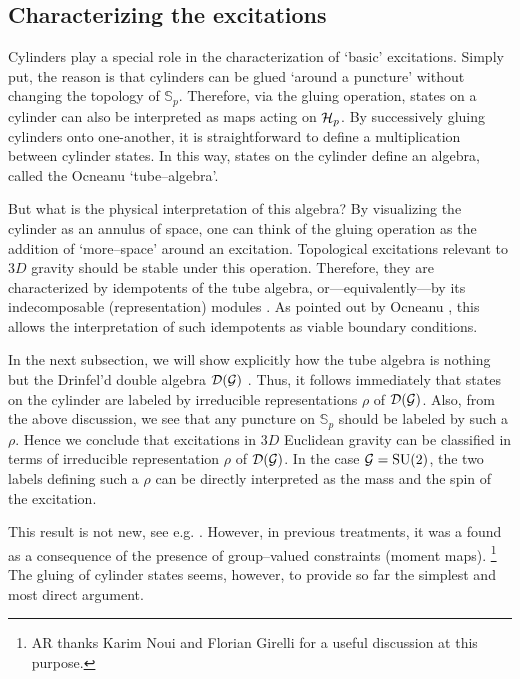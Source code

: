 \documentclass[nofootinbib,superscriptaddress,eqsecnum,tightenlines,11pt]{revtex4-1}
\def\SU{\text{SU}}
\renewcommand{\S}{{\mathbb S}}
\begin{document}
\subsection{Characterizing the excitations}

Cylinders play a special role in the characterization of `basic' excitations. 
Simply put, the reason is that cylinders can be glued `around a puncture' without changing the topology of $\S_p$.
Therefore, via the gluing operation, states on a cylinder can also be interpreted as maps acting on ${\cal H}_p$.
By successively gluing cylinders onto one-another, it is straightforward to define a multiplication between cylinder states.
In this way, states on the cylinder define an algebra, called the Ocneanu `tube--algebra'. 

But what is the physical interpretation of this algebra?
By visualizing the cylinder as an annulus of space, one can think of the gluing operation as the addition of `more--space' around an excitation.
Topological excitations relevant to $3D$ gravity should be stable under this operation.
Therefore, they are characterized by idempotents of the tube algebra, or---equivalently---by its indecomposable (representation) modules \cite{Ocneanu, Lan}.
As pointed out by Ocneanu \cite{Ocneanu}, this allows the  interpretation of such idempotents as viable boundary conditions.

In the next subsection, we will show explicitly how the tube algebra is nothing but the Drinfel'd double algebra ${\cal D}({\cal G})$  \cite{DrinfeldDouble}.
Thus, it follows immediately that states on the cylinder are labeled by irreducible representations $\rho$ of ${\cal D}({\cal G})$.
Also, from the above discussion, we see that any puncture on $\S_p$ should be labeled by such a $\rho$.
Hence we conclude that excitations in $3D$ Euclidean gravity can be classified in terms of irreducible representation $\rho$ of ${\cal D}({\cal G})$. 
In the case ${\cal G}=\SU(2)$, the two labels defining such a $\rho$ can be directly interpreted as the mass and the spin of the excitation.

This result is not new, see e.g. \cite{Freidel2, KarimDrinfeld, BonzomEtAl, PranzEtAl}.
However, in previous treatments, it was a found as a consequence of the presence of group--valued constraints (moment maps).%
\footnote{AR thanks Karim Noui and Florian Girelli for a useful discussion at this purpose.}
The gluing of cylinder states seems, however, to provide so far the simplest and most direct argument.
\end{document}
